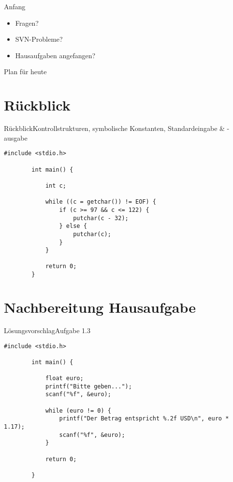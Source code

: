 \documentclass[10pt]{beamer} %
\date{}
\begin{document}
\maketitle

\begin{frame}{Anfang}

	\begin{itemize}
		\item Fragen?
		\item SVN-Probleme?
		\item Hausaufgaben angefangen?
	\end{itemize}

\end{frame}

\begin{frame}{Plan für heute}

	\tableofcontents

\end{frame}

\section{Rückblick}

\begin{frame}[fragile]{Rückblick}{Kontrollstrukturen, symbolische Konstanten, Standardeingabe \& -ausgabe}

	\begin{lstlisting}[gobble=4]
		#include <stdio.h>
		
		int main() {
			
			int c;
			
			while ((c = getchar()) != EOF) {
				if (c >= 97 && c <= 122) {
					putchar(c - 32);
				} else {
					putchar(c);
				}
			}
			
			return 0;
		}
	\end{lstlisting}

\end{frame}

\section{Nachbereitung Hausaufgabe}

\begin{frame}[fragile]{Lösungsvorschlag}{Aufgabe 1.3}

	\begin{lstlisting}[gobble=4]
		#include <stdio.h> 
		
		int main() {
			
			float euro;
			printf("Bitte geben...");
			scanf("%f", &euro);
			
			while (euro != 0) {
				printf("Der Betrag entspricht %.2f USD\n", euro * 1.17);
				scanf("%f", &euro);
			}
			
			return 0;
			
		}
	\end{lstlisting}

\end{frame}
\end{document}
